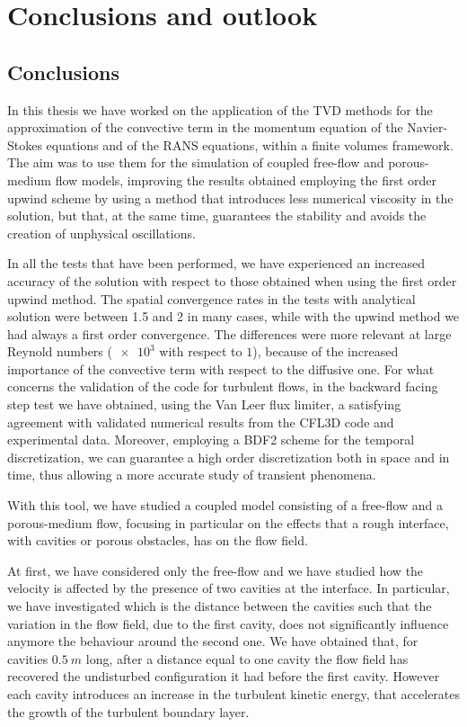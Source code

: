 \chapter{Conclusions and outlook}
\section{Conclusions}
In this thesis we have worked on the application of the TVD methods for the 
approximation of the convective term in the momentum equation of the 
Navier-Stokes equations and of the RANS equations, within a finite volumes 
framework. The aim was to use them for the simulation of coupled free-flow and 
porous-medium flow models, improving the results obtained employing the 
first order upwind scheme by using a method that introduces less numerical 
viscosity in the solution, but that, at the same time, guarantees the stability 
and avoids the creation of unphysical oscillations.

In all the tests that have been performed, we have experienced an increased 
accuracy of the solution with respect to those obtained when using the first order 
upwind method. The spatial convergence rates in the tests with analytical 
solution were between 1.5 and 2 in many cases, while with the upwind method we had always a first order convergence. 
The differences were more relevant at large Reynold numbers ($\num{e3}$ with respect to $1$), because of the increased importance of the convective term with respect to the diffusive one.
For what concerns the validation of the code for turbulent flows, in the backward facing 
step test we have 
obtained, using the Van Leer flux limiter, a satisfying agreement with 
validated numerical results from the CFL3D code and experimental data.
Moreover, employing a BDF2 scheme for the 
temporal discretization, we can guarantee a high order discretization both 
in space and in time, thus allowing a more accurate study of transient 
phenomena.

With this tool, we have studied a coupled model consisting of a free-flow and a 
porous-medium flow, focusing in particular on the effects that a rough
interface, with cavities or porous obstacles, has on the flow field.

At first, we have considered only the free-flow and we have studied how the 
velocity is affected by the presence of two cavities at the interface.
In particular, we have investigated which is the distance between the cavities such that the variation in the flow field, 
due to the first cavity, does not significantly influence anymore the 
behaviour around the 
second one. We have obtained that, for cavities $\SI{0.5}{m}$ long, after a 
distance equal to one cavity the flow field has recovered the undisturbed configuration it 
had before the first cavity. However each cavity introduces an increase in the 
turbulent kinetic energy, that accelerates the growth of the turbulent 
boundary layer.

